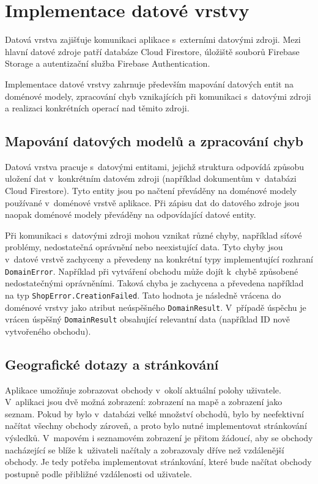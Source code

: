 \section{Implementace datové vrstvy}
Datová vrstva zajišťuje komunikaci aplikace s~externími datovými zdroji.
Mezi hlavní datové zdroje patří databáze Cloud Firestore, úložiště souborů Firebase Storage a autentizační služba Firebase Authentication.

Implementace datové vrstvy zahrnuje především mapování datových entit na doménové modely, zpracování chyb vznikajících při komunikaci s~datovými zdroji a realizaci konkrétních operací nad těmito zdroji.

\subsection{Mapování datových modelů a zpracování chyb}
Datová vrstva pracuje s~datovými entitami, jejichž struktura odpovídá způsobu uložení dat v~konkrétním datovém zdroji (například dokumentům v~databázi Cloud Firestore).
Tyto entity jsou po načtení převáděny na doménové modely používané v~doménové vrstvě aplikace.
Při zápisu dat do datového zdroje jsou naopak doménové modely převáděny na odpovídající datové entity.

Při komunikaci s~datovými zdroji mohou vznikat různé chyby, například síťové problémy, nedostatečná oprávnění nebo neexistující data.
Tyto chyby jsou v~datové vrstvě zachyceny a převedeny na konkrétní typy implementující rozhraní \texttt{Domain\-Error}.
Například při vytváření obchodu může dojít k~chybě způsobené nedostatečnými oprávněními.
Taková chyba je zachycena a převedena například na typ \texttt{Shop\-Error.\-Creation\-Failed}.
Tato hodnota je následně vrácena do doménové vrstvy jako atribut neúspěšného \texttt{Domain\-Result}.
V~případě úspěchu je vrácen úspěšný \texttt{Domain\-Result} obsahující relevantní data (například ID nově vytvořeného obchodu).

\subsection{Geografické dotazy a stránkování}
Aplikace umožňuje zobrazovat obchody v~okolí aktuální polohy uživatele.
V~aplikaci jsou dvě možná zobrazení: zobrazení na mapě a zobrazení jako seznam.
Pokud by bylo v~databázi velké množství obchodů, bylo by neefektivní načítat všechny obchody zároveň, a proto bylo nutné implementovat stránkování výsledků.
V~mapovém i seznamovém zobrazení je přitom žádoucí, aby se obchody nacházející se blíže k~uživateli načítaly a zobrazovaly dříve než vzdálenější obchody.
Je tedy potřeba implementovat stránkování, které bude načítat obchody postupně podle přibližné vzdálenosti od uživatele.

